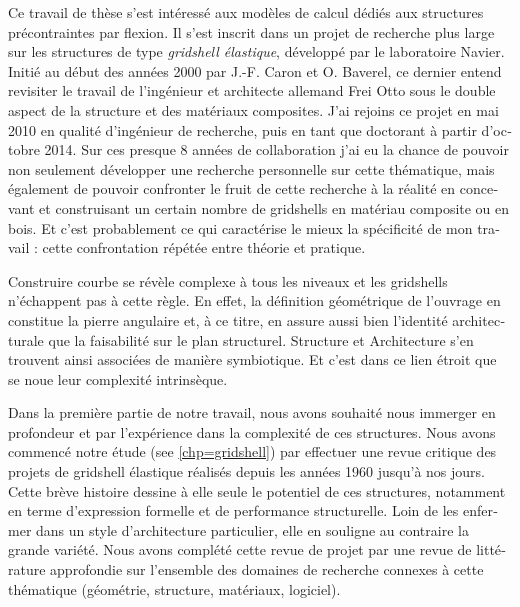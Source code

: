 \begin{otherlanguage}{french}

Ce travail de thèse s'est intéressé aux modèles de calcul dédiés aux structures précontraintes par flexion. Il s'est inscrit dans un projet de recherche plus large sur les structures de type \emph{gridshell élastique}, développé par le laboratoire Navier. Initié au début des années 2000 par J.-F. Caron et O. Baverel, ce dernier entend revisiter le travail de l'ingénieur et architecte allemand Frei Otto sous le double aspect de la structure et des matériaux composites. J’ai rejoins ce projet en mai 2010 en qualité d’ingénieur de recherche, puis en tant que doctorant à partir d’octobre 2014. Sur ces presque 8 années de collaboration j’ai eu la chance de pouvoir non seulement développer une recherche personnelle sur cette thématique, mais également de pouvoir confronter le fruit de cette recherche à la réalité en concevant et construisant un certain nombre de gridshells en matériau composite ou en bois. Et c’est probablement ce qui caractérise le mieux la spécificité de mon travail : cette confrontation répétée entre théorie et pratique.

Construire courbe se révèle complexe à tous les niveaux et les gridshells n’échappent pas à cette règle. En effet, la définition géométrique de l’ouvrage en constitue la pierre angulaire et, à ce titre, en assure aussi bien l’identité architecturale que la faisabilité sur le plan structurel. Structure et Architecture s’en trouvent ainsi associées de manière symbiotique. Et c’est dans ce lien étroit que se noue leur complexité intrinsèque.

Dans la première partie de notre travail, nous avons souhaité nous immerger en profondeur et par l’expérience dans la complexité de ces structures. Nous avons commencé notre étude (see \cref{chp=gridshell}) par effectuer une revue critique des projets de gridshell élastique réalisés depuis les années 1960 jusqu’à nos jours. Cette brève histoire dessine à elle seule le potentiel de ces structures, notamment en terme d’expression formelle et de performance structurelle. Loin de les enfermer dans un style d’architecture particulier, elle en souligne au contraire la grande variété. Nous avons complété cette revue de projet par une revue de littérature approfondie sur l’ensemble des domaines de recherche connexes à cette thématique (géométrie, structure, matériaux, logiciel).


\end{otherlanguage}
